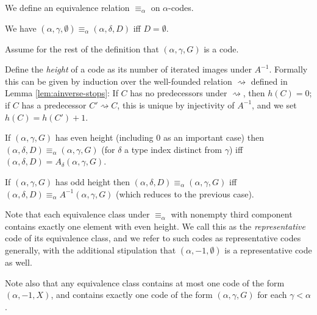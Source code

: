 \begin{definition}
\label {def:equiv-code}
We define an equivalence relation $\equiv_\alpha$ on $\alpha$-codes.

We have $(\alpha,\gamma,\emptyset) \equiv_\alpha (\alpha,\delta,D)$ iff $D=\emptyset$.

Assume for the rest of the definition that $(\alpha,\gamma,G)$ is a code.

Define the \emph{height} of a code as its number of iterated images under $A^{-1}$.  Formally this can be given by induction over the well-founded relation $\rightsquigarrow$ defined in Lemma \ref{lem:ainverse-stops}: If $C$ has no predecessors under $\rightsquigarrow$, then $h(C) = 0$; if $C$ has a predecessor $C' \rightsquigarrow C$, this is unique by injectivity of $A^{-1}$, and we set $h(C) = h(C') + 1$.

If $(\alpha,\gamma,G)$ has even height (including 0 as an important case)
then $(\alpha,\delta,D) \equiv_\alpha (\alpha,\gamma,G)$ (for $\delta$ a type index distinct from $\gamma$) iff
$(\alpha,\delta,D) = A_\delta(\alpha,\gamma,G)$.

If $(\alpha,\gamma,G)$ has odd height then $(\alpha,\delta,D) \equiv_\alpha (\alpha,\gamma,G)$ iff $(\alpha,\delta,D) \equiv_\alpha A^{-1}(\alpha,\gamma,G)$ (which reduces to the previous case).
\end{definition}

\begin{definition}
\label{def:representative-code}
Note that each equivalence class under $\equiv_\alpha$ with nonempty third component contains exactly one element with even height.  We call this as the \emph{representative} code of its equivalence class, and we refer to such codes as representative codes generally, with the additional stipulation that $(\alpha,-1,\emptyset)$ is a representative code as well.

Note also that any equivalence class contains at most one code of the form $(\alpha,-1,X)$, and contains exactly one code of the form $(\alpha,\gamma,G)$ for each $\gamma < \alpha$.
\end{definition}

